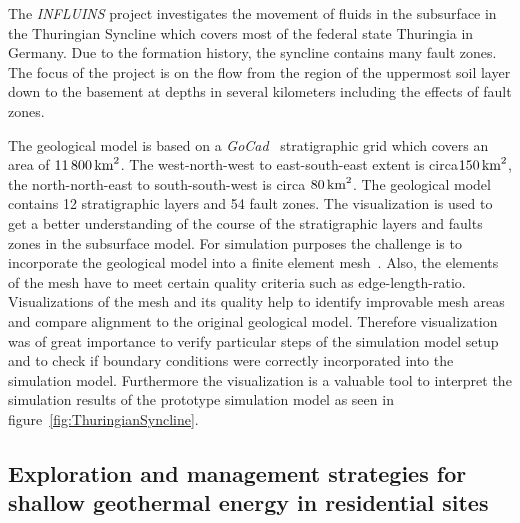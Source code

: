 \documentclass[twocolumn]{svjour3}          %
\begin{document}
The \emph{INFLUINS} project investigates the movement of fluids in the subsurface in the Thuringian Syncline which covers most of the federal state Thuringia in Germany. Due to the formation history, the syncline contains many fault zones. The focus of the project is on the flow from the region of the uppermost soil layer down to the basement at depths in several kilometers including the effects of fault zones.

The geological model is based on a \emph{GoCad}~\cite{web:gocad} stratigraphic grid which covers an area of $11\,800\,\textnormal{km}^2$. The west-north-west to east-south-east extent is circa\linebreak $150\,\textnormal{km}^2$, the north-north-east to south-south-west is circa $80\,\textnormal{km}^2$. The geological model contains 12 stratigraphic layers and 54 fault zones. The visualization is used to get a better understanding of the course of the stratigraphic layers and faults zones in the subsurface model. For simulation purposes the challenge is to incorporate the geological model into a finite element mesh~\cite{zehner:gocad}. Also, the elements of the mesh have to meet certain quality criteria such as edge-length-ratio. Visualizations of the mesh and its quality help to identify improvable mesh areas and compare alignment to the original geological model. Therefore visualization was of great importance to verify particular steps of the simulation model setup and to check if boundary conditions were correctly incorporated into the simulation model. Furthermore the visualization is a valuable tool to interpret the simulation results of the prototype simulation model as seen in figure~\ref{fig:ThuringianSyncline}.


\subsection{Exploration and management strategies for shallow geothermal energy in residential sites}
\label{shallow-geothermal}
\end{document}
